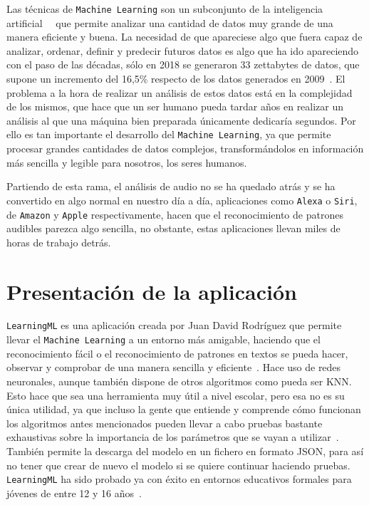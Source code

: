 \documentclass[a4paper, 12pt]{book}
\begin{document}
Las técnicas de \texttt{Machine Learning} son un subconjunto de la inteligencia artificial~~\cite{zhang2020machine} que permite analizar una cantidad de datos muy grande de una manera eficiente y buena. La necesidad de que apareciese algo que fuera capaz de analizar, ordenar, definir y predecir futuros datos es algo que ha ido apareciendo con el paso de las décadas, sólo en 2018 se generaron 33 zettabytes de datos, que supone un incremento del 16,5\% respecto de los datos generados en 2009~\cite{cantidad-datos}. El problema a la hora de realizar un análisis de estos datos está en la complejidad de los mismos, que hace que un ser humano pueda tardar años en realizar un análisis al que una máquina bien preparada únicamente dedicaría segundos. Por ello es tan importante el desarrollo del \texttt{Machine Learning}, ya que permite procesar grandes cantidades de datos complejos, transformándolos en información más sencilla y legible para nosotros, los seres humanos.

Partiendo de esta rama, el análisis de audio no se ha quedado atrás y se ha convertido en algo normal en nuestro día a día, aplicaciones como \texttt{Alexa} o \texttt{Siri}, de \texttt{Amazon} y \texttt{Apple} respectivamente, hacen que el reconocimiento de patrones audibles parezca algo sencilla, no obstante, estas aplicaciones llevan miles de horas de trabajo detrás.

\section{Presentación de la aplicación}
\label{sec:presentacion}

\texttt{LearningML} es una aplicación creada por Juan David Rodríguez que permite llevar el \texttt{Machine Learning} a un entorno más amigable, haciendo que el reconocimiento fácil o el reconocimiento de patrones en textos se pueda hacer, observar y comprobar de una manera sencilla y eficiente~\cite{garcia2020learningml}. Hace uso de redes neuronales, aunque también dispone de otros algoritmos como pueda ser KNN. Esto hace que sea una herramienta muy útil a nivel escolar, pero esa no es su única utilidad, ya que incluso la gente que entiende y comprende cómo funcionan los algoritmos antes mencionados pueden llevar a cabo pruebas bastante exhaustivas sobre la importancia de los parámetros que se vayan a utilizar~\cite{garcia2019developing}. También permite la descarga del modelo en un fichero en formato JSON, para así no tener que crear de nuevo el modelo si se quiere continuar haciendo pruebas. \texttt{LearningML} ha sido probado ya con éxito en entornos educativos formales para jóvenes de entre 12 y 16 años~\cite{rodriguez2021evaluation}.
\end{document}
